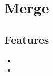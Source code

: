 \section{Merge}
\label{module:Merge}
\ClearAPI
\TODO
\subsection{Features}
\begin{itemize}
	\item {}
	\item {}
\end{itemize}